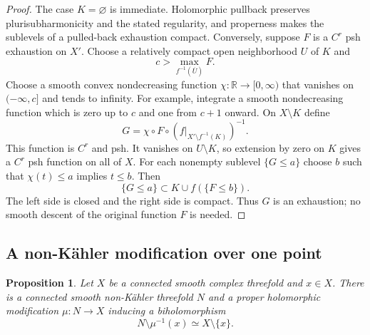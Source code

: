 \documentclass[11pt]{amsart}
\newtheorem{proposition}[theorem]{Proposition}
\theoremstyle{definition}
\theoremstyle{remark}
\numberwithin{equation}{section}
\newcommand{\R}{\mathbb R}
\begin{document}
\begin{proof}
The case $K=\varnothing$ is immediate.  Holomorphic pullback preserves
plurisubharmonicity and the stated
regularity, and properness makes the sublevels of a pulled-back
exhaustion compact.  Conversely, suppose $F$ is a $C^r$ psh exhaustion
on $X'$.  Choose a relatively compact open neighborhood $U$ of $K$ and
\[
 c>\max_{f^{-1}(\overline U)}F.
\]
Choose a smooth convex nondecreasing function
$\chi:\R\to[0,\infty)$ that vanishes on $(-\infty,c]$ and tends to
infinity.  For example, integrate a smooth nondecreasing function
which is zero up to $c$ and one from $c+1$ onward.  On $X\setminus K$
define
\[
 G=\chi\circ F\circ(f|_{X'\setminus f^{-1}(K)})^{-1}.
\]
This function is $C^r$ and psh.  It vanishes on $U\setminus K$, so
extension by zero on $K$ gives a $C^r$ psh function on all of $X$.
For each nonempty sublevel $\{G\le a\}$ choose $b$ such that
$\chi(t)\le a$ implies $t\le b$.  Then
\[
 \{G\le a\}\subset K\cup f(\{F\le b\}).
\]
The left side is closed and the right side is compact.  Thus $G$ is an
exhaustion; no smooth descent of the original function $F$ is needed.
\end{proof}

\subsection{A non-K\"ahler modification over one point}

\begin{proposition}\label{prop:point-modification}
Let $X$ be a connected smooth complex threefold and $x\in X$.
There is a connected smooth non-K\"ahler threefold $N$ and a proper
holomorphic modification $\mu:N\to X$ inducing a biholomorphism
\[
 N\setminus\mu^{-1}(x)\simeq X\setminus\{x\}.
\]
\end{proposition}
\end{document}
